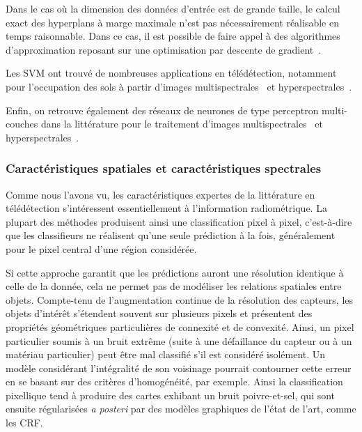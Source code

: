 Dans le cas où la dimension des données d'entrée est de grande taille, le calcul exact des hyperplans à marge maximale n'est pas nécessairement réalisable en temps raisonnable. Dans ce cas, il est possible de faire appel à des algorithmes d'approximation reposant sur une optimisation par descente de gradient~\cite{bottou_large-scale_2010}.

Les \gls{SVM} ont trouvé de nombreuses applications en télédétection, notamment pour l'occupation des sols à partir d'images multispectrales~\cite{pal_support_2005} et hyperspectrales~\cite{melgani_classification_2004}.

Enfin, on retrouve également des réseaux de neurones de type perceptron multi-couches dans la littérature pour le traitement d'images multispectrales~\cite{benediktsson_neural_1990} et hyperspectrales~\cite{goel_classification_2003}.

\subsubsection{Caractéristiques spatiales et caractéristiques spectrales}

Comme nous l'avons vu, les caractéristiques expertes de la littérature en télédétection s'intéressent essentiellement à l'information radiométrique. La plupart des méthodes produisent ainsi une classification pixel à pixel, c'est-à-dire que les classifieurs ne réalisent qu'une seule prédiction à la fois, généralement pour le pixel central d'une région considérée.

Si cette approche garantit que les prédictions auront une résolution identique à celle de la donnée, cela ne permet pas de modéliser les relations spatiales entre objets. Compte-tenu de l'augmentation continue de la résolution des capteurs, les objets d'intérêt s'étendent souvent sur plusieurs pixels et présentent des propriétés géométriques particulières de connexité et de convexité. Ainsi, un pixel particulier soumis à un bruit extrême (suite à une défaillance du capteur ou à un matériau particulier) peut être mal classifié s'il est considéré isolément. Un modèle considérant l'intégralité de son voisinage pourrait contourner cette erreur en se basant sur des critères d'homogénéité, par exemple. Ainsi la classification pixellique tend à produire des cartes exhibant un bruit poivre-et-sel, qui sont ensuite régularisées \emph{a posteri} par des modèles graphiques de l'état de l'art, comme les \gls{CRF}.

